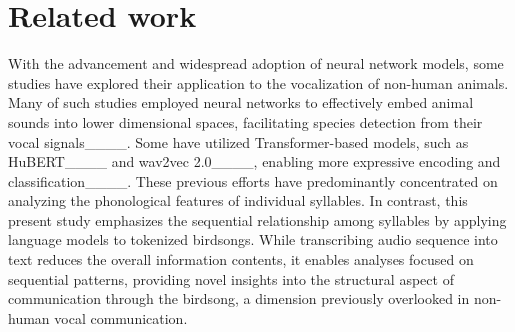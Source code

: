 \section{Related work}
With the advancement and widespread adoption of neural network models, some studies have explored their application to the vocalization of non-human animals. Many of such studies employed neural networks to effectively embed animal sounds into lower dimensional spaces, facilitating species detection from their vocal signals____. Some have utilized Transformer-based models, such as HuBERT____ and wav2vec 2.0____, enabling more expressive encoding and classification____. 
These previous efforts have predominantly concentrated on analyzing the phonological features of individual syllables. In contrast, this present study emphasizes the sequential relationship among syllables by applying language models to tokenized birdsongs. While transcribing audio sequence into text reduces the overall information contents, it enables analyses focused on sequential patterns, providing novel insights into the structural aspect of communication through the birdsong, a dimension previously overlooked in non-human vocal communication.